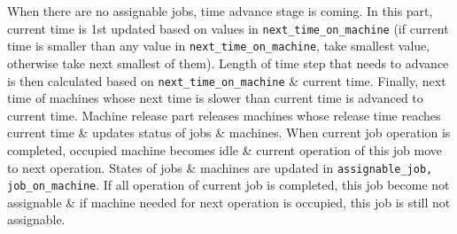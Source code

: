 \documentclass{article}
\begin{document}
\begin{itemize}
\begin{itemize}
        When there are no assignable jobs, time advance stage is coming. In this part, current time is 1st updated based on values in \verb|next_time_on_machine| (if current time is smaller than any value in \verb|next_time_on_machine|, take smallest value, otherwise take next smallest of them). Length of time step that needs to advance is then calculated based on \verb|next_time_on_machine| \& current time. Finally, next time of machines whose next time is slower than current time is advanced to current time. Machine release part releases machines whose release time reaches current time \& updates status of jobs \& machines. When current job operation is completed, occupied machine becomes idle \& current operation of this job move to next operation. States of jobs \& machines are updated in \verb|assignable_job, job_on_machine|. If all operation of current job is completed, this job become not assignable \& if machine needed for next operation is occupied, this job is still not assignable.


\end{itemize}
\end{itemize}
\end{document}
